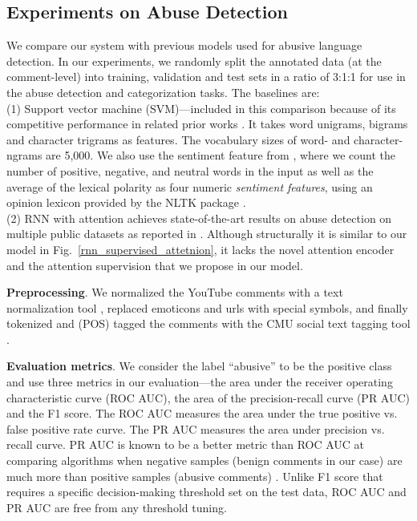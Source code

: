 \documentclass[letterpaper]{article}
\begin{document}
\subsection{Experiments on Abuse Detection}

We compare our system with previous models used for abusive language detection.
In our experiments, we randomly split the annotated data (at the comment-level) into training, validation and test sets in a ratio of 3:1:1 for use in the  abuse detection and categorization tasks.
The baselines are: \\
\noindent(1) Support vector machine (SVM)---included in this comparison because of its competitive performance in related prior works \cite{van2015detection,nobata2016abusive}. It takes word unigrams, bigrams and character trigrams as features. The vocabulary sizes of word- and character- ngrams are 5,000.
We also use the sentiment feature from \cite{van2015detection}, where we count the number of positive, negative, and neutral words in the input as well as the average of the lexical polarity as four numeric \textit{sentiment features}, using an opinion lexicon  provided by the NLTK package  \cite{opinionlexicon}. \\
\noindent(2) RNN with attention achieves state-of-the-art results on abuse detection on multiple public datasets as reported in \cite{chakrabarty2019pay}. Although structurally it is similar to our model in Fig.~\ref{rnn_supervised_attetnion}, it lacks the novel attention encoder and the  attention supervision that we propose in our model.


\noindent\textbf{Preprocessing}.
We normalized the YouTube comments with a text normalization tool \cite{tweet_preprocessor}, replaced  emoticons and urls  with special symbols, and  finally tokenized and (POS) tagged the comments with the CMU social text tagging tool \cite{owoputi2013improved}.



\noindent\textbf{Evaluation metrics}.
We consider the label ``abusive'' to be the positive class and use three metrics in our evaluation---the area under the receiver operating characteristic curve (ROC AUC), the area of the precision-recall curve (PR AUC) and the F1 score.
The ROC AUC measures the area under the true positive vs. false positive rate curve. The PR AUC measures the area under precision vs. recall curve.
PR AUC is known to be a better metric than ROC AUC at comparing algorithms when  negative samples (benign comments in our case) are much more than positive samples (abusive comments) \cite{davis2006relationship}. Unlike F1 score that requires a specific decision-making threshold set on the test data,  ROC AUC and PR AUC are free from any threshold tuning.
\end{document}
